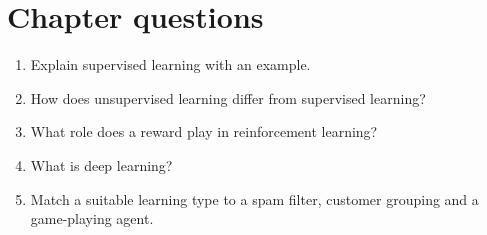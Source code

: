 \documentclass[11pt,openany,oneside]{book}
\begin{document}
\section{Chapter questions}
\begin{enumerate}
\item Explain supervised learning with an example.
\item How does unsupervised learning differ from supervised learning?
\item What role does a reward play in reinforcement learning?
\item What is deep learning?
\item Match a suitable learning type to a spam filter, customer grouping and a game-playing agent.
\end{enumerate}
\end{document}
